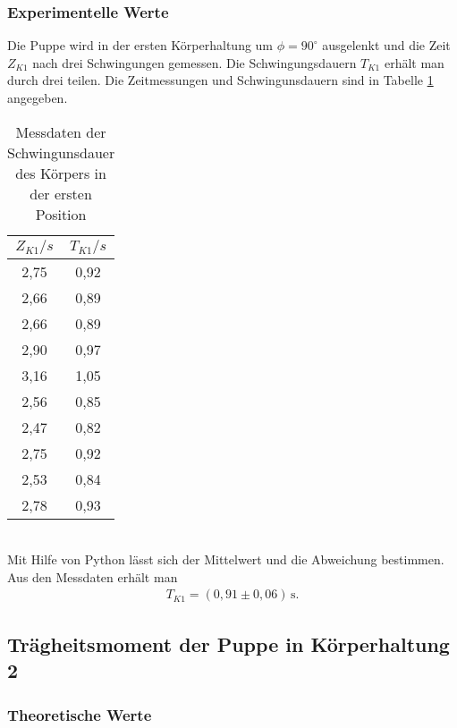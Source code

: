 \subsubsection{Experimentelle Werte}
Die Puppe wird in der ersten Körperhaltung um $\phi = 90^{\circ}$ ausgelenkt und die Zeit $Z_{K1}$ nach drei
Schwingungen gemessen. Die Schwingungsdauern $T_{K1}$ erhält man durch drei teilen. Die Zeitmessungen und
Schwingunsdauern sind in Tabelle \ref{tab:Koerper1} angegeben.
\begin{table}
  \centering
  \caption{Messdaten der Schwingunsdauer des Körpers in der ersten Position}
  \label{tab:Koerper1}
  \begin{tabular}{c c}
    \toprule
    $Z_{K1}/s$ & $T_{K1}/s$ \\
    \midrule
    2,75 & 0,92 \\
    2,66 & 0,89 \\
    2,66 & 0,89 \\
    2,90 & 0,97 \\
    3,16 & 1,05 \\
    2,56 & 0,85 \\
    2,47 & 0,82 \\
    2,75 & 0,92 \\
    2,53 & 0,84 \\
    2,78 & 0,93 \\
    \bottomrule
  \end{tabular}
\end{table}
\\
Mit Hilfe von Python lässt sich der Mittelwert und die Abweichung bestimmen. Aus den Messdaten
erhält man
\begin{align*}
  T_{K1} = (0{,}91 \pm 0{,}06)\, \mathrm{s} .
\end{align*}
\subsection{Trägheitsmoment der Puppe in Körperhaltung 2}
\subsubsection{Theoretische Werte}

